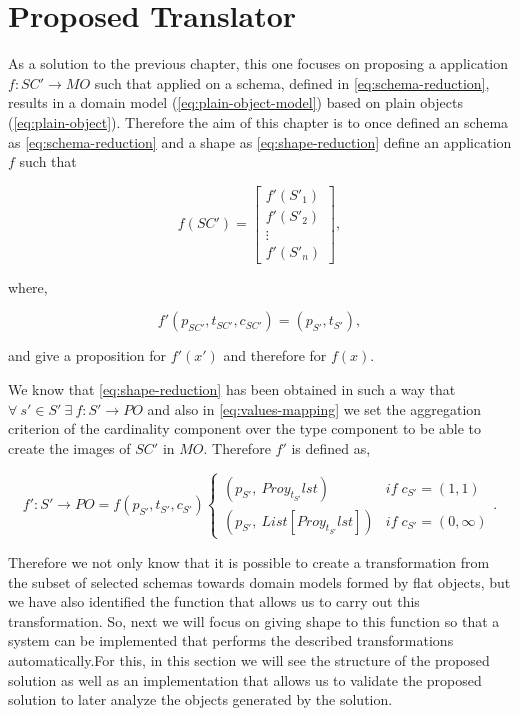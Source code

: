 \chapter{Proposed Translator}
\label{ch:proposed-system}
As a solution to the previous chapter, this one focuses on proposing a application $f : SC' \rightarrow MO$ such that applied on a
schema, defined in \cref{eq:schema-reduction}, results in a domain model (\cref{eq:plain-object-model}) based on plain objects (\cref{eq:plain-object}).
Therefore the aim of this chapter is to once defined an schema as \cref{eq:schema-reduction} and a shape as \cref{eq:shape-reduction} define
an application $f$ such that

\begin{equation}
f(SC')=
\begin{bmatrix}f'(S'_1)
\\ f'(S'_2)
\\ \vdots
\\ f'(S'_n)
\end{bmatrix},
\end{equation}

where,

\begin{equation}
	f'(p_{SC'},t_{SC'},c_{SC'}) = (p_{S'},t_{S'}),
\end{equation}

and give a proposition for $f'(x')$ and therefore for $f(x)$.

We know that \cref{eq:shape-reduction} has been obtained in such a way that $\forall\ s' \in S'\ \exists\ f:S' \rightarrow PO$ and also in \cref{eq:values-mapping} we set
the aggregation criterion of the cardinality component over the type component to be able to create the images of $SC'$ in $MO$. Therefore $f'$ is defined as,

\begin{equation}
f':S' \rightarrow PO = f(p_{S'},t_{S'},c_{S'}) \begin{cases}
	(p_{S'},\ Proy_{t_{S'}}lst) & if \; c_{S'}=(1,1) \\
	(p_{S'},\ List[Proy_{t_{S'}}lst]) & if \; c_{S'}=(0,\infty)
   \end{cases}.
\end{equation}

Therefore we not only know that it is possible to create a transformation from the subset of selected schemas
towards domain models formed by flat objects, but we have also identified the function that allows us to carry
out this transformation. So, next we will focus on giving shape to this function so that a system can be
implemented that performs the described transformations automatically.For this, in this section we will see
the structure of the proposed solution as well as an implementation that allows us to validate the proposed
solution to later analyze the objects generated by the solution.

